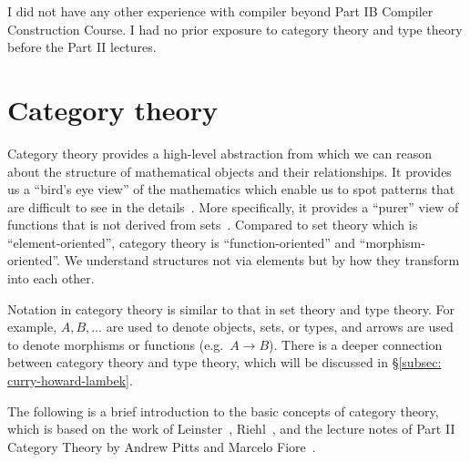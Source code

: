 \documentclass[12pt,twoside,a4paper]{report}
\theoremstyle{definition}
\theoremstyle{definition}
\theoremstyle{definition}
\theoremstyle{definition}
\newcommand{\secref}[1]{\S\ref{#1}}
\begin{document}
    I did not have any other experience with compiler beyond Part IB Compiler Construction Course. I had no prior exposure to category theory and type theory before the Part II lectures.


    \section{Category theory} \label{sec: cat}
        Category theory provides a high-level abstraction from which we can reason about the structure of mathematical objects and their relationships. It provides us a ``bird's eye view'' of the mathematics which enable us to spot patterns that are difficult to see in the details~\cite{basic_cat}. More specifically, it provides a ``purer'' view of functions that is not derived from sets~\cite{scott-lambda}. Compared to set theory which is ``element-oriented'', category theory is ``function-oriented'' and ``morphism-oriented''. We understand structures not via elements but by how they transform into each other. 

        Notation in category theory is similar to that in set theory and type theory. For example, $A, B, \dots$ are used to denote objects, sets, or types, and arrows are used to denote morphisms or functions (e.g.\ $A \to B$). There is a deeper connection between category theory and type theory, which will 
        be discussed in \secref{subsec: curry-howard-lambek}. 


        The following is a brief introduction to the basic concepts of category theory, which is based on the work of Leinster~\cite{basic_cat}, 
        Riehl~\cite{cat_context}, and the lecture notes of Part II Category Theory by Andrew Pitts and Marcelo Fiore~\cite{cat_lecture_notes}.
\end{document}
